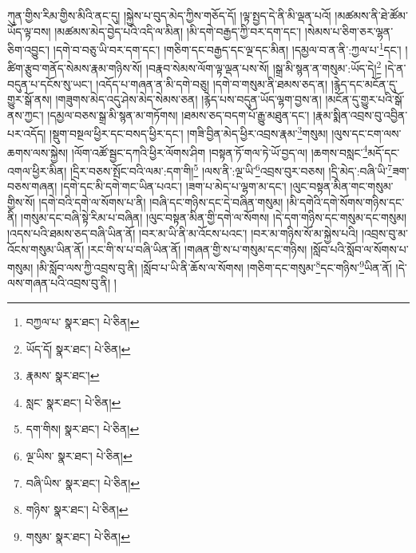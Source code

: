ཀུན་གྱིས་རིམ་གྱིས་མིའི་ནང་དུ། །སྐྱེས་པ་བུད་མེད་ཀྱིས་གཅོད་དོ། །ལྟ་སྤྱད་དེ་ནི་མི་ལྡན་པའོ། །མཚམས་ནི་ཐེ་ཚོམ་ཡོད་ལྟ་བས། །མཚམས་མེད་བྱེད་པའི་འདི་ལ་མིན། །མི་དགེ་བརྒྱད་ཀྱི་བར་དག་དང་། །སེམས་པ་ཅིག་ཅར་ལྷན་ཅིག་འབྱུང་། །དགེ་བ་བཅུ་ཡི་བར་དག་དང་། །གཅིག་དང་བརྒྱད་དང་ལྔ་དང་མིན། །དམྱལ་བ་ན་ནི་:ཀྱལ་པ་\footnote{བཀྱལ་པ་  སྣར་ཐང་།  པེ་ཅིན། }དང་། །ཚིག་རྩུབ་གནོད་སེམས་རྣམ་གཉིས་སོ། །བརྣབ་སེམས་ལོག་ལྟ་ལྡན་པས་སོ། །སྒྲ་མི་སྙན་ན་གསུམ་:ཡོད་དེ།\footnote{ཡོད་དོ།  སྣར་ཐང་།  པེ་ཅིན། } །དེ་ན་བདུན་པ་དངོས་སུ་ཡང་། །འདོད་པ་གཞན་ན་མི་དགེ་བཅུ། །དགེ་བ་གསུམ་ནི་ཐམས་ཅད་ན། །རྙེད་དང་མངོན་དུ་གྱུར་སྒོ་ནས། །གཟུགས་མེད་འདུ་ཤེས་མེད་སེམས་ཅན། །རྙེད་པས་བདུན་ཡོད་ལྷག་བྱས་ན། །མངོན་དུ་གྱུར་པའི་སྒོ་ནས་ཀྱང་། །དམྱལ་བཅས་སྒྲ་མི་སྙན་མ་གཏོགས། །ཐམས་ཅད་བདག་པོ་རྒྱུ་མཐུན་དང་། །རྣམ་སྨིན་འབྲས་བུ་འབྱིན་པར་འདོད། །སྡུག་བསྔལ་ཕྱིར་དང་བསད་ཕྱིར་དང་། །གཟི་བྱིན་མེད་ཕྱིར་འབྲས་རྣམ་\footnote{རྣམས་  སྣར་ཐང་། }གསུམ། །ལུས་དང་ངག་ལས་ཆགས་ལས་སྐྱེས། །ལོག་འཚོ་སྦྱང་དཀའི་ཕྱིར་ལོགས་ཤིག །བསྟན་ཏོ་གལ་ཏེ་ཡོ་བྱད་ལ། །ཆགས་བསླང་\footnote{སླང་  སྣར་ཐང་།  པེ་ཅིན། }མདོ་དང་འགལ་ཕྱིར་མིན། །དྲིར་བཅས་སྤོང་བའི་ལམ་:དག་གི།\footnote{དག་གིས།  སྣར་ཐང་།  པེ་ཅིན། } །ལས་ནི་:ལྔ་ཡི་\footnote{ལྔ་ཡིས་  སྣར་ཐང་།  པེ་ཅིན། }འབྲས་བུར་བཅས། །དྲི་མེད་:བཞི་ཡི་\footnote{བཞི་ཡིས་  སྣར་ཐང་།  པེ་ཅིན། }ཟག་བཅས་གཞན། །དགེ་དང་མི་དགེ་གང་ཡིན་པའང་། །ཟག་པ་མེད་པ་ལྷག་མ་དང་། །ལུང་བསྟན་མིན་གང་གསུམ་གྱིས་སོ། །དགེ་བའི་དགེ་ལ་སོགས་པ་ནི། །བཞི་དང་གཉིས་དང་དེ་བཞིན་གསུམ། །མི་དགེའི་དགེ་སོགས་གཉིས་དང་ནི། །གསུམ་དང་བཞི་སྟེ་རིམ་པ་བཞིན། །ལུང་བསྟན་མིན་གྱི་དགེ་ལ་སོགས། །དེ་དག་གཉིས་དང་གསུམ་དང་གསུམ། །འདས་པའི་ཐམས་ཅད་བཞི་ཡིན་ནོ། །བར་མ་ཡི་ནི་མ་འོངས་པའང་། །བར་མ་གཉིས་སོ་མ་སྐྱེས་པའི། །འབྲས་བུ་མ་འོངས་གསུམ་ཡིན་ནོ། །རང་གི་ས་པ་བཞི་ཡིན་ནོ། །གཞན་གྱི་ས་པ་གསུམ་དང་གཉིས། །སློབ་པའི་སློབ་ལ་སོགས་པ་གསུམ། །མི་སློབ་ལས་ཀྱི་འབྲས་བུ་ནི། །སློབ་པ་ཡི་ནི་ཆོས་ལ་སོགས། །གཅིག་དང་གསུམ་\footnote{གཉིས་  སྣར་ཐང་།  པེ་ཅིན། }དང་གཉིས་\footnote{གསུམ་  སྣར་ཐང་།  པེ་ཅིན། }ཡིན་ནོ། །དེ་ལས་གཞན་པའི་འབྲས་བུ་ནི། །

